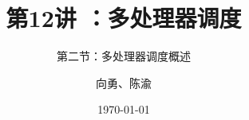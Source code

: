 


\title[第1讲]{第12讲 ：多处理器调度} %
\subtitle{第二节：多处理器调度概述}
\author{向勇、陈渝} %
\date{\today} %




\begin{frame}
\titlepage %
\end{frame}

%
%

